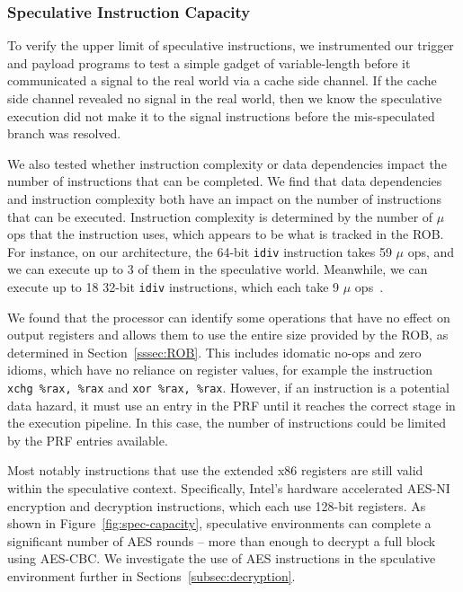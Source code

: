 
\subsubsection{Speculative Instruction Capacity}

To verify the upper limit of speculative instructions, we instrumented our
trigger and payload programs to test a simple gadget of variable-length before it
communicated a signal to the real world via a cache side channel. If the cache
side channel revealed no signal in the real world, then we know the speculative
execution did not make it to the signal instructions before the mis-speculated
branch was resolved.

We also tested whether instruction complexity or data dependencies impact the
number of instructions that can be completed. We find that data dependencies and
instruction complexity both have an impact on the number of instructions that
can be executed. Instruction complexity is determined by the number of $\mu$ ops
that the instruction uses, which appears to be what is tracked in the ROB. For
instance, on our architecture, the 64-bit \texttt{idiv} instruction takes 59
$\mu$ ops, and we can execute up to 3 of them in the speculative world.
Meanwhile, we can execute up to 18 32-bit \texttt{idiv} instructions, which each
take 9 $\mu$ ops~\cite{intel-instruction-tables}.

We found that the processor can identify some operations that have no effect on
output registers and allows them to use the entire size provided by the ROB, as
determined in Section~\ref{sssec:ROB}. This includes idomatic no-ops and zero
idioms, which have no reliance on register values, for example the instruction
\texttt{xchg \%rax, \%rax} and \texttt{xor \%rax, \%rax}. However, if an
instruction is a potential data hazard, it must use an entry in the PRF until it
reaches the correct stage in the execution pipeline. In this case, the number of
instructions could be limited by the PRF entries available.


Most notably instructions that use the extended x86 registers are still valid
within the speculative context. Specifically, Intel's hardware accelerated
AES-NI encryption and decryption instructions, which each use 128-bit registers.
As shown in Figure~\ref{fig:spec-capacity}, speculative environments can
complete a significant number of AES rounds -- more than enough to decrypt a
full block using AES-CBC. We investigate the use of AES instructions in the
spculative environment further in Sections~\ref{subsec:decryption}.

